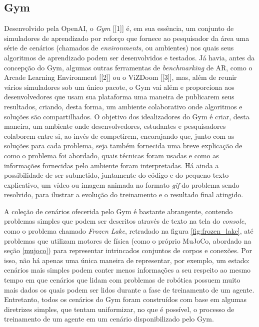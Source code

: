 \documentclass[cic,tc]{iiufrgs}
\begin{document}
\subsection{Gym}
\label{gym}
%
%
Desenvolvido pela OpenAI, o \textit{Gym} [[1]] é, em sua essência, um conjunto
de simuladores de aprendizado por reforço que fornece ao pesquisador da área uma
série de cenários (chamados de \textit{environments}, ou ambientes) nos quais
seus algoritmos de aprendizado podem ser desenvolvidos e testados. Já havia,
antes da concepção do Gym, algumas outras ferramentas de \textit{benchmarking}
de AR, como o Arcade Learning Environment [[2]] ou o ViZDoom [[3]], mas, além de
reunir vários simuladores sob um único pacote, o Gym vai além e proporciona aos
desenvolvedores que usam sua plataforma uma maneira de publicarem seus
resultados, criando, desta forma, um ambiente colaborativo onde algoritmos
e soluções são compartilhados. O objetivo dos
idealizadores do Gym é criar, desta maneira, um ambiente onde desenvolvedores,
estudantes e pesquisadores colaborem entre si, ao invés de competirem,
encorajando que, junto com as soluções para cada problema, seja também fornecida
uma breve explicação de como o problema foi abordado, quais técnicas foram
usadas e como as informações fornecidas pelo ambiente foram interpretadas. Há
ainda a possibilidade de ser submetido, juntamente do código e do pequeno texto
explicativo, um vídeo ou imagem animada no formato \textit{gif} do problema
sendo resolvido, para ilustrar a evolução do treinamento e o resultado final
atingido.


A coleção de cenários ofecerida pelo Gym é bastante abrangente, contendo
problemas simples que podem ser descritos através de texto na tela do
\textit{console}, como  o problema chamado \textit{Frozen Lake}, retradado na
figura \ref{fig:frozen_lake}, até problemas que utilizam motores de física (como
o próprio MuJoCo, abordado na seção \ref{mujoco}) para representar intrincados
conjuntos de corpos e conexões. Por isso, não há apenas uma única maneira de
representar, por exemplo, um estado: cenários mais simples podem conter menos
informações a seu respeito ao mesmo tempo em que cenários que lidam com
problemas de robótica possuem muito mais dados os quais podem ser lidos durante
a fase de treinamento de um agente. Entretanto, todos os cenários do Gym foram
construídos com base em algumas diretrizes simples, que tentam uniformizar, no
que é possível, o processo de treinamento de um agente em um cenário
disponibilizado pelo Gym.
\end{document}
